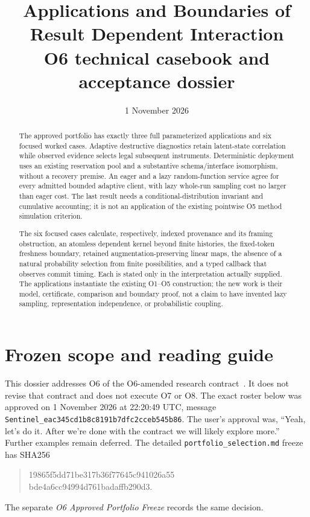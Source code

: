 \documentclass[11pt,a4paper]{article}
\title{Applications and Boundaries of Result Dependent Interaction\\[5pt]
\large O6 technical casebook and acceptance dossier}
\author{}
\date{1 November 2026}
\theoremstyle{definition}
\begin{document}
\maketitle

\begin{abstract}
The approved portfolio has exactly three full parameterized applications
and six focused worked cases. Adaptive destructive diagnostics retain
latent-state correlation while observed evidence selects legal subsequent
instruments. Deterministic deployment uses an existing reservation pool
and a substantive schema/interface isomorphism, without a recovery premise.
An eager and a lazy random-function service agree for every admitted bounded
adaptive client, with lazy whole-run sampling cost no larger than eager
cost. The last result needs a conditional-distribution invariant and
cumulative accounting; it is not an application of the existing pointwise
O5 method simulation criterion.

The six focused cases calculate, respectively, indexed provenance and its
framing obstruction, an atomless dependent kernel beyond finite histories,
the fixed-token freshness boundary, retained augmentation-preserving linear
maps, the absence of a natural probability selection from finite
possibilities, and a typed callback that observes commit timing. Each is
stated only in the interpretation actually supplied. The applications
instantiate the existing O1--O5 construction; the new work is their model,
certificate, comparison and boundary proof, not a claim to have invented
lazy sampling, representation independence, or probabilistic coupling.
\end{abstract}
\tableofcontents

\section{Frozen scope and reading guide}\label{sec:freeze}
This dossier addresses O6 of the O6-amended research contract~\cite{Contract}.
It does not revise that contract and does not execute O7 or O8. The exact
roster below was approved on 1 November 2026 at 22:20:49 UTC, message
\texttt{Sentinel\_eac345cd1b8c8191b7dfc2cceb545b86}. The user's approval
was, ``Yeah, let's do it. After we're done with the contract we will likely
explore more.'' Further examples remain deferred. The detailed
\texttt{portfolio\_selection.md} freeze has SHA256
\begin{quote}\small\ttfamily
19865f5dd71be317b36f77645c941026a55\\
bde4a6cc94994d761badaffb290d3.
\end{quote}
The separate \emph{O6 Approved Portfolio Freeze} records the same decision.
\end{document}
